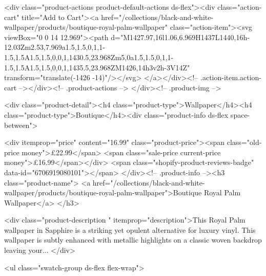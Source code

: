 {{{{{{{<div class="product-actions product-default-actions ds-flex"><div class="action-cart" title="Add to Cart"><a href="/collections/black-and-white-wallpaper/products/boutique-royal-palm-wallpaper" class="action-item"><svg viewBox="0 0 14 12.969"><path d="M1427.97,16l1.06,6.969H1437L1440,16h-12.03Zm2.53,7.969a1.5,1.5,0,1,1-1.5,1.5A1.5,1.5,0,0,1,1430.5,23.968Zm5,0a1.5,1.5,0,1,1-1.5,1.5A1.5,1.5,0,0,1,1435.5,23.968ZM1426,14h3v2h-3V14Z" transform="translate(-1426 -14)"/></svg>
</a></div><!-- .action-item.action-cart --></div><!-- .product-actions -->
</div><!-- .product-img -->

<div class="product-detail"><h4 class="product-type">Wallpaper</h4><h4 class="product-type">Boutique</h4><div class="product-info ds-flex space-between">
    
<div itemprop="price" content="16.99" class="product-price"><span class="old-price money">£22.99</span>
    <span class="sale-price current-price money">£16.99</span></div>
    <span class="shopify-product-reviews-badge" data-id="6706919080101"></span>
  </div><!-- .product-info --><h3 class="product-name">
      <a href="/collections/black-and-white-wallpaper/products/boutique-royal-palm-wallpaper">Boutique Royal Palm Wallpaper</a>
    </h3>
    
<div class="product-description " itemprop="description">This Royal Palm wallpaper in Sapphire is a striking yet opulent alternative for luxury vinyl. This wallpaper is subtly enhanced with metallic highlights on a classic woven backdrop leaving your...
</div>



<ul class="swatch-group ds-flex flex-wrap">
        
}}}}}}}
